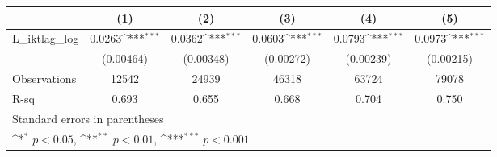 {
\def\sym#1{\ifmmode^{#1}\else\(^{#1}\)\fi}
\begin{tabular}{l*{5}{c}}
\hline\hline
                &\multicolumn{1}{c}{(1)}         &\multicolumn{1}{c}{(2)}         &\multicolumn{1}{c}{(3)}         &\multicolumn{1}{c}{(4)}         &\multicolumn{1}{c}{(5)}         \\
\hline
L\_iktlag\_log    &   0.0263\sym{***}&   0.0362\sym{***}&   0.0603\sym{***}&   0.0793\sym{***}&   0.0973\sym{***}\\
                &(0.00464)         &(0.00348)         &(0.00272)         &(0.00239)         &(0.00215)         \\
\hline
Observations    &    12542         &    24939         &    46318         &    63724         &    79078         \\
R-sq            &    0.693         &    0.655         &    0.668         &    0.704         &    0.750         \\
\hline\hline
\multicolumn{6}{l}{\footnotesize Standard errors in parentheses}\\
\multicolumn{6}{l}{\footnotesize \sym{*} \(p<0.05\), \sym{**} \(p<0.01\), \sym{***} \(p<0.001\)}\\
\end{tabular}
}
